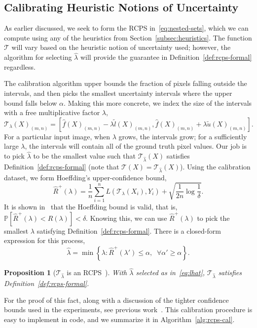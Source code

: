\documentclass[10pt]{article}
\newtheorem{prop}{Proposition}
\newcommand{\T}{\mathcal{T}}
\newcommand{\lhat}{\hat{\lambda}}
\renewcommand{\P}{\mathbb{P}}
\begin{document}
\subsection{Calibrating Heuristic Notions of Uncertainty}
\label{subsec:calibration}



As earlier discussed, we seek to form the RCPS in~\eqref{eq:nested-sets}, which we can compute using any of the heuristics from Section~\ref{subsec:heuristics}.
The function $\T$ will vary based on the heuristic notion of uncertainty used; however, the algorithm for selecting $\lhat$ will provide the guarantee in Definition~\ref{def:rcps-formal} regardless.

The calibration algorithm upper bounds the fraction of pixels falling outside the intervals, and then picks the smallest uncertainty intervals where the upper bound falls below $\alpha$.
Making this more concrete, we index the size of the intervals with a free multiplicative factor $\lambda$,
\begin{equation}
    \T_{\lambda}(X)_{(m,n)} = \left[\hat{f}(X)_{(m,n)}-\lambda \tilde{l}(X)_{(m,n)}, \hat{f}(X)_{(m,n)} + \lambda \tilde{u}(X)_{(m,n)} \right].
\end{equation}
For a particular input image, when $\lambda$ grows, the intervals grow; for a sufficiently large $\lambda$, the intervals will contain all of the ground truth pixel values.
Our job is to pick $\lhat$ to be the smallest value such that $\T_{\lhat}(X)$ satisfies Definition~\ref{def:rcps-formal} (note that $\T(X)=\T_{\lhat}(X)$).
Using the calibration dataset, we form Hoeffding's upper-confidence bound,
\begin{equation}
    \widehat{R}^+(\lambda)= \frac{1}{n}\sum\limits_{i=1}^nL(\T_{\lambda}(X_i),Y_i)+\sqrt{\frac{1}{2n}\log\frac{1}{\delta}}.
\end{equation}
It is shown in~\cite{hoeffding1963} that the Hoeffding bound is valid, that is, $\P\left[\widehat{R}^+(\lambda) < R(\lambda) \right] < \delta$. 
Knowing this, we can use $\widehat{R}^+(\lambda)$ to pick the smallest $\lambda$ satisfying Definition~\ref{def:rcps-formal}.
There is a closed-form expression for this process,
\begin{equation}
    \label{eq:lhat}
    \lhat = \min\left\{\lambda : \widehat{R}^+(\lambda') \leq \alpha, \;\; \forall \alpha' \geq \alpha \right\}.
\end{equation}
\begin{prop}[$\T_{\lhat}$ is an RCPS~\citep{bates2021distribution}]
    \label{prop:rcps-guarantee}
    With $\lhat$ selected as in~\eqref{eq:lhat}, $\T_{\lhat}$ satisfies Definition~\ref{def:rcps-formal}.
\end{prop}
For the proof of this fact, along with a discussion of the tighter confidence bounds used in the experiments, see previous work~\cite{bates2021distribution,angelopoulos2021learn}.
This calibration procedure is easy to implement in code, and we summarize it in Algorithm~\ref{alg:rcps-cal}.
\end{document}
